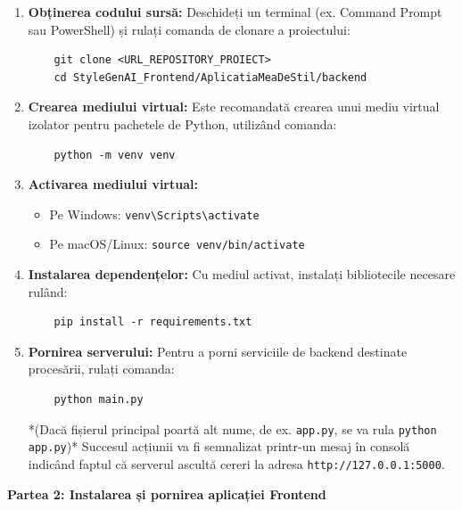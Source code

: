 \begin{enumerate}
    \item \textbf{Obținerea codului sursă:} Deschideți un terminal (ex. Command Prompt sau PowerShell) și rulați comanda de clonare a proiectului:
    \begin{verbatim}
    git clone <URL_REPOSITORY_PROIECT>
    cd StyleGenAI_Frontend/AplicatiaMeaDeStil/backend
    \end{verbatim}
    
    \item \textbf{Crearea mediului virtual:} Este recomandată crearea unui mediu virtual izolator pentru pachetele de Python, utilizând comanda:
    \begin{verbatim}
    python -m venv venv
    \end{verbatim}
    
    \item \textbf{Activarea mediului virtual:}
    \begin{itemize}
        \item Pe Windows: \texttt{venv\textbackslash Scripts\textbackslash activate}
        \item Pe macOS/Linux: \texttt{source venv/bin/activate}
    \end{itemize}
    
    \item \textbf{Instalarea dependențelor:} Cu mediul activat, instalați bibliotecile necesare rulând:
    \begin{verbatim}
    pip install -r requirements.txt
    \end{verbatim}
    
    \item \textbf{Pornirea serverului:} Pentru a porni serviciile de backend destinate procesării, rulați comanda:
    \begin{verbatim}
    python main.py 
    \end{verbatim}
    *(Dacă fișierul principal poartă alt nume, de ex. \texttt{app.py}, se va rula \texttt{python app.py})*
    Succesul acțiunii va fi semnalizat printr-un mesaj în consolă indicând faptul că serverul ascultă cereri la adresa \texttt{http://127.0.0.1:5000}.
\end{enumerate}

\textbf{Partea 2: Instalarea și pornirea aplicației Frontend}

